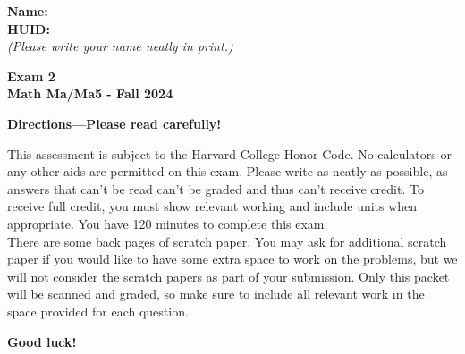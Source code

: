 \documentclass{article}
\begin{document}
\noindent
{\large \mbox{} \hfill \bf Name:\underline{\hspace{3in}}}\\

{\large \mbox{} \hfill \bf HUID:\underline{\hspace{3in}}}\\
{\mbox{} \hfill \it (Please write your name neatly in print.)}\\


 
\medskip
 
\noindent
{\large\bf
Exam 2 \\ Math Ma/Ma5 - Fall 2024}
\noindent


{\Large
\begin{center}\textbf{Directions---Please read carefully!} \end{center}}




This assessment is subject to the Harvard College Honor Code. No calculators or any other aids are permitted on this exam.  Please write as neatly as possible, as answers that can't be read can't be graded and thus can't receive credit. To receive full credit, you must show relevant working
and include units when appropriate. You have 120 minutes to complete this exam.   \\

There are some back pages of scratch paper. You may ask for additional scratch paper if you would like to have some extra space to work on the problems, but we will not consider the scratch papers as part of your submission. Only this packet will be scanned and graded, so make sure to include all relevant work in the space provided for each question. 

\begin{center}\textbf{Good luck!}\end{center}
\end{document}
